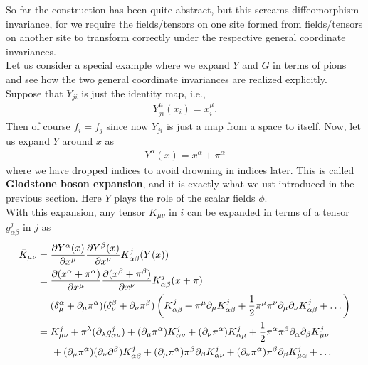 \documentclass{book}
\theoremstyle{definition}
\newcommand{\p}{\partial}
\newcommand{\nn}{\nonumber}
\newcommand{\f}[2]{\frac{#1}{#2}}
\newcommand{\lp}{\left(}
\newcommand{\rp}{\right)}
\begin{document}
So far the construction has been quite abstract, but this screams diffeomorphism invariance, for we require the fields/tensors on one site formed from fields/tensors on another site to transform correctly under the respective general coordinate invariances. \\

Let us consider a special example where we expand $Y$ and $G$ in terms of pions and see how the two general coordinate invariances are realized explicitly. Suppose that $Y_{ji}$ is just the identity map, i.e.,
\begin{align}
Y_{ji}^\mu(x_i) = x^\mu_i.
\end{align}
Then of course $f_i = f_j$ since now $Y_{ji}$ is just a map from a space to itself. Now, let us expand $Y$ around $x$ as
\begin{align}
Y^\alpha(x) = x^\alpha + \pi^\alpha 
\end{align}
where we have dropped indices to avoid drowning in indices later. This is called \textbf{Glodstone boson expansion}, and it is exactly what we ust introduced in the previous section. Here $Y$ plays the role of the scalar fields $\phi$. \\

With this expansion, any tensor $\bar{K}_{\mu\nu}$ in $i$ can be expanded in terms of a tensor $g^j_{\alpha \beta}$ in $j$ as
\begin{align}
\bar{K}_{\mu\nu} &= \f{\p Y^\alpha (x)}{\p x^\mu}\f{\p Y^\beta (x)}{\p x^\nu} K^j_{\alpha\beta}(Y(x)) \nn\\
&= \f{\p (x^\alpha + \pi^\alpha)}{\p x^\mu}\f{\p (x^\beta + \pi^\beta)}{\p x^\nu} K^j_{\alpha\beta}(x + \pi) \nn\\
&= (\delta^\alpha_\mu + \p_\mu\pi^\alpha)(\delta^\beta_\nu + \p_\nu \pi^\beta)\lp K^j_{\alpha\beta} + \pi^\mu \p_\mu K^j_{\alpha\beta} + \f{1}{2}\pi^\mu \pi^\nu \p_\mu \p_\nu K^j_{\alpha\beta} + \dots \rp\nn\\
&= K^j_{\mu\nu} + \pi^\lambda (\p_\lambda g^j_{\alpha\nu}) + (\p_\mu\pi^\alpha)K^j_{\alpha\nu} + (\p_\nu \pi^\alpha)K^j_{\alpha\mu} + \f{1}{2}\pi^\alpha\pi^\beta \p_\alpha\p_\beta K^j_{\mu\nu} \nn\\
&\hspace{0.5cm} + (\p_\mu \pi^\alpha)(\p_\nu \p^\beta)K^j_{\alpha\beta} + (\p_\mu \pi^\alpha)\pi^\beta \p_\beta K^j_{\alpha\nu} + (\p_\nu \pi^\alpha)\pi^\beta \p_\beta K^j_{\mu\alpha} + \dots
\end{align}
\end{document}
